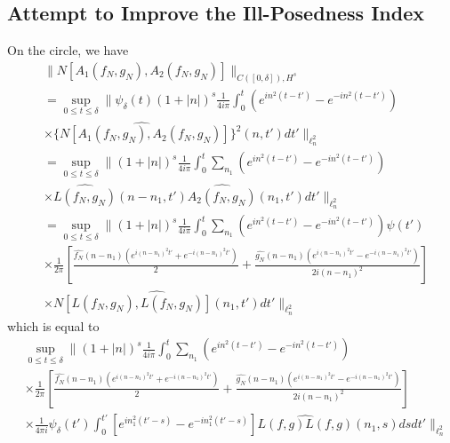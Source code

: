 \documentclass[12pt,reqno]{amsart}
\numberwithin{equation}{section}  %
\newcommand{\wh}{\widehat}
\begin{document}
\subsection{Attempt to Improve the Ill-Posedness Index} 
\label{sec:ill-pos-improv}
On the circle, we have
%
%
\begin{equation*}
\begin{split}
  & \| N[A_{1}(f_{N}, g_{N}), A_{2}(f_{N}, {g_{N}})] \|_{C([0, \delta]),
  H^{s}}
  \\
  & = \sup_{0 \le t \le \delta} \| \psi_{\delta}(t) (1 + | n |)^{s}
  \frac{1}{4 i \pi} \int_{0}^{t} \left( e^{in^{2}(t-t')} - e^{-in^{2}(t-t')} \right)
  \\
  & \times \wh{\{N[A_{1}(f_{N}, g_{N}), A_{2}(f_{N}, g_{N})]} \}^{2}(n, t') dt'
  \|_{\ell^{2}_{n}}
  \\
  & = \sup_{0 \le t \le \delta} \| (1 + | n |)^{s} \frac{1}{4 i \pi} 
  \int_{0}^{t} \sum_{n_{1}} \left( e^{in^{2}(t-t')} - e^{-in^{2}(t-t')} \right)
  \\
  & \times \wh{L(f_{N},g_{N})}(n - n_{1}, t')\wh{A_{2}(f_{N},g_{N})}(n_{1}, t') dt'
  \|_{\ell^{2}_{n}}
  \\
  & = \sup_{0 \le t \le \delta} \| (1 + | n |)^{s} \frac{1}{4 i \pi} 
  \int_{0}^{t} \sum_{n_{1}} \left( e^{in^{2}(t-t')} - e^{-in^{2}(t-t')} \right)
  \psi(t')
  \\
  & \times \frac{1}{2 \pi} \left[ \frac{\wh{f_{N}}(n - n_{1})\left( e^{i(n - n_{1})^{2}t'} +
  e^{-i(n - n_{1})^{2}t'} \right)}{2} + \frac{\wh{g_{N}}(n - n_{1})\left(
  e^{i(n - n_{1})^{2}t'} - e^{-i(n - n_{1})^{2}t'}
  \right)}{2i(n - n_{1})^{2}} \right]
  \\
  & \times \wh{N[L(f_{N}, g_{N}), L(f_{N}, g_{N})](n_{1}, t')} dt' \|_{\ell^{2}_{n}}
\end{split}
\end{equation*}
which is equal to
\begin{equation*}
  \begin{split}
  & \sup_{0 \le t \le \delta} \| (1 + | n |)^{s} \frac{1}{4 i \pi} 
  \int_{0}^{t} \sum_{n_{1}} \left( e^{in^{2}(t-t')} - e^{-in^{2}(t-t')} \right)
  \\
  & \times \frac{1}{2 \pi} \left[ \frac{\wh{f_{N}}(n - n_{1})\left( e^{i(n - n_{1})^{2}t'} +
  e^{-i(n - n_{1})^{2}t'} \right)}{2} + \frac{\wh{g_{N}}(n - n_{1})\left(
  e^{i(n - n_{1})^{2}t'} - e^{-i(n - n_{1})^{2}t'}
  \right)}{2i(n - n_{1})^{2}} \right]
  \\
  & \times \frac{1}{4 \pi i} \psi_{\delta}(t') \int_{0}^{t'} \left[ e^{in_{1}^{2}(t' -s)} -
  e^{-in_{1}^{2}(t' -s)} \right] \wh{L(f, g) L(f,g)}(n_{1},s) ds dt'  \|_{\ell^{2}_{n}}
\end{split}
\end{equation*}
\end{document}
